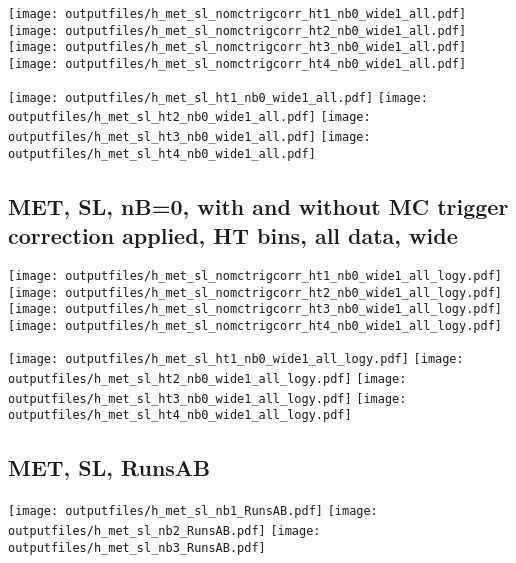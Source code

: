 \documentclass[11pt]{article}
\begin{document}
    \noindent
     \texttt{[image: outputfiles/h\_met\_sl\_nomctrigcorr\_ht1\_nb0\_wide1\_all.pdf]}
     \texttt{[image: outputfiles/h\_met\_sl\_nomctrigcorr\_ht2\_nb0\_wide1\_all.pdf]}
     \texttt{[image: outputfiles/h\_met\_sl\_nomctrigcorr\_ht3\_nb0\_wide1\_all.pdf]}
     \texttt{[image: outputfiles/h\_met\_sl\_nomctrigcorr\_ht4\_nb0\_wide1\_all.pdf]}

    \noindent
     \texttt{[image: outputfiles/h\_met\_sl\_ht1\_nb0\_wide1\_all.pdf]}
     \texttt{[image: outputfiles/h\_met\_sl\_ht2\_nb0\_wide1\_all.pdf]}
     \texttt{[image: outputfiles/h\_met\_sl\_ht3\_nb0\_wide1\_all.pdf]}
     \texttt{[image: outputfiles/h\_met\_sl\_ht4\_nb0\_wide1\_all.pdf]}

    \clearpage
     \subsection{ MET, SL, nB=0, with and without MC trigger correction applied, HT bins, all data, wide}

    \noindent
     \texttt{[image: outputfiles/h\_met\_sl\_nomctrigcorr\_ht1\_nb0\_wide1\_all\_logy.pdf]}
     \texttt{[image: outputfiles/h\_met\_sl\_nomctrigcorr\_ht2\_nb0\_wide1\_all\_logy.pdf]}
     \texttt{[image: outputfiles/h\_met\_sl\_nomctrigcorr\_ht3\_nb0\_wide1\_all\_logy.pdf]}
     \texttt{[image: outputfiles/h\_met\_sl\_nomctrigcorr\_ht4\_nb0\_wide1\_all\_logy.pdf]}


    \noindent
     \texttt{[image: outputfiles/h\_met\_sl\_ht1\_nb0\_wide1\_all\_logy.pdf]}
     \texttt{[image: outputfiles/h\_met\_sl\_ht2\_nb0\_wide1\_all\_logy.pdf]}
     \texttt{[image: outputfiles/h\_met\_sl\_ht3\_nb0\_wide1\_all\_logy.pdf]}
     \texttt{[image: outputfiles/h\_met\_sl\_ht4\_nb0\_wide1\_all\_logy.pdf]}


     \clearpage

     \subsection{ MET, SL, RunsAB}

    \noindent
     \texttt{[image: outputfiles/h\_met\_sl\_nb1\_RunsAB.pdf]}
     \texttt{[image: outputfiles/h\_met\_sl\_nb2\_RunsAB.pdf]}
     \texttt{[image: outputfiles/h\_met\_sl\_nb3\_RunsAB.pdf]}
\end{document}
